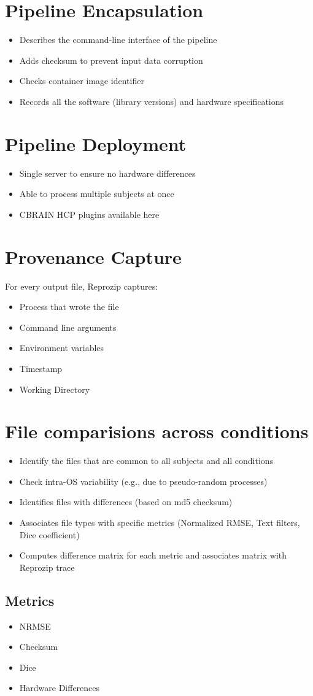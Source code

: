 \section{Pipeline Encapsulation}
\begin{itemize}
  \item Describes the command-line interface of the pipeline
  \item Adds checksum to prevent input data corruption
  \item Checks container image identifier
  \item Records all the software (library versions) and hardware specifications
\end{itemize}

\section{Pipeline Deployment}
\begin{itemize}
  \item Single server to ensure no hardware differences
  \item Able to process multiple subjects at once
  \item CBRAIN HCP plugins available here
\end{itemize}

\section{Provenance Capture}
\begin{flushleft}
For every output file, Reprozip captures: 
\end{flushleft}
\begin{itemize}
  \item Process that wrote the file
  \item Command line arguments
  \item Environment variables
  \item Timestamp
  \item Working Directory
\end{itemize}

\section{File comparisions across conditions}
\begin{itemize}
 \item Identify the files that are common to all subjects and all conditions
 \item Check intra-OS variability (e.g., due to pseudo-random processes)
 \item Identifies files with differences (based on md5 checksum)
 \item Associates file types with specific metrics (Normalized RMSE, Text filters, Dice coefficient)
 \item Computes difference matrix for each metric and associates matrix with Reprozip trace
\end{itemize}

\subsection{Metrics}
\begin{itemize}
\item NRMSE
\item Checksum
\item Dice
\item Hardware Differences
\end{itemize}
